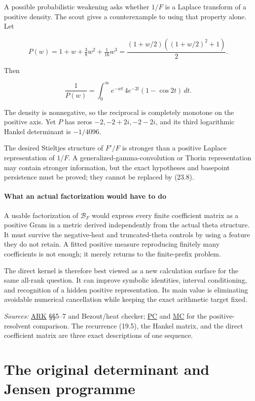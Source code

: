 \documentclass[
  10pt,
  a4paper,
  10pt,
  oneside,
  openany]{book}
\begin{document}
A possible probabilistic weakening asks whether \(1/F\) is a Laplace
transform of a positive density. The scout gives a counterexample to
using that property alone. Let

\[
P(w)=1+w+\tfrac38w^2+\tfrac1{16}w^3
=\frac{(1+w/2)((1+w/2)^2+1)}2.
\tag{23.7}\label{eq:23.7}
\]

Then

\[
\frac1{P(w)}=\int_0^\infty e^{-wt}\,4e^{-2t}(1-\cos2t)\,dt.
\tag{23.8}\label{eq:23.8}
\]

The density is nonnegative, so the reciprocal is completely monotone on
the positive axis. Yet \(P\) has zeros \(-2,-2+2i,-2-2i\), and its third
logarithmic Hankel determinant is \(-1/4096\).

The desired Stieltjes structure of \(F'/F\) is stronger than a positive
Laplace representation of \(1/F\). A generalized-gamma-convolution or
Thorin representation may contain stronger information, but the exact
hypotheses and basepoint persistence must be proved; they cannot be
replaced by (23.8).

\subsection{What an actual factorization would have to
do}\label{what-an-actual-factorization-would-have-to-do}

A usable factorization of \(\mathcal B_F\) would express every finite
coefficient matrix as a positive Gram in a metric derived independently
from the actual theta structure. It must survive the negative-heat and
truncated-theta controls by using a feature they do not retain. A fitted
positive measure reproducing finitely many coefficients is not enough;
it merely returns to the finite-prefix problem.

The direct kernel is therefore best viewed as a new calculation surface
for the same all-rank question. It can improve symbolic identities,
interval conditioning, and recognition of a hidden positive
representation. Its main value is eliminating avoidable numerical
cancellation while keeping the exact arithmetic target fixed.

\emph{Sources:} \hyperref[source-ark]{ARK} §§5--7 and Bezout/heat
checker; \hyperref[source-pc]{PC} and \hyperref[source-mc]{MC} for the
positive-resolvent comparison. The recurrence (19.5), the Hankel matrix,
and the direct coefficient matrix are three exact descriptions of one
sequence.

\part{The original determinant and Jensen programme}
\end{document}
